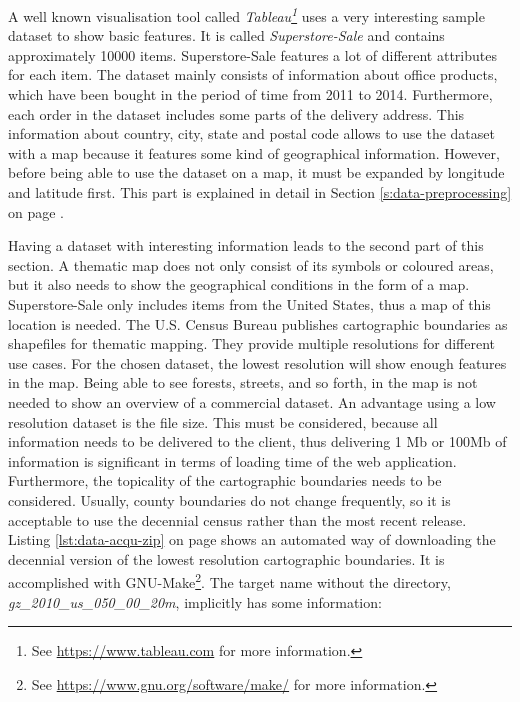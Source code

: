 A well known visualisation tool called \textit{Tableau\footnote{See \href{https://www.tableau.com}{https://www.tableau.com} for more information.}} uses a very interesting sample dataset to show basic features. It is called \textit{Superstore-Sale} and contains approximately 10000 items. Superstore-Sale features a lot of different attributes for each item. The dataset mainly consists of information about office products, which have been bought in the period of time from 2011 to 2014. Furthermore, each order in the dataset includes some parts of the delivery address. This information about country, city, state and postal code allows to use the dataset with a map because it features some kind of geographical information. However, before being able to use the dataset on a map, it must be expanded by longitude and latitude first. This part is explained in detail in Section \ref{s:data-preprocessing} on page \pageref{s:data-preprocessing}.

Having a dataset with interesting information leads to the second part of this section. A thematic map does not only consist of its symbols or coloured areas, but it also needs to show the geographical conditions in the form of a map. Superstore-Sale only includes items from the United States, thus a map of this location is needed. The U.S. Census Bureau publishes cartographic boundaries as shapefiles for thematic mapping. They provide multiple resolutions for different use cases. For the chosen dataset, the lowest resolution will show enough features in the map. Being able to see forests, streets, and so forth, in the map is not needed to show an overview of a commercial dataset. An advantage using a low resolution dataset is the file size. This must be considered, because all information needs to be delivered to the client, thus delivering 1 \ac{Mb} or 100\ac{Mb} of information is significant in terms of loading time of the web application.
Furthermore, the topicality of the cartographic boundaries needs to be considered. Usually, county boundaries do not change frequently, so it is acceptable to use the decennial census rather than the most recent release. Listing \ref{lst:data-acqu-zip} on page \pageref{lst:data-acqu-zip} shows an automated way of downloading the decennial version of the lowest resolution cartographic boundaries. It is accomplished with GNU-Make\footnote{See \href{https://www.gnu.org/software/make/}{https://www.gnu.org/software/make/} for more information.}. The target name without the directory, \textit{gz\_2010\_us\_050\_00\_20m}, implicitly has some information:

